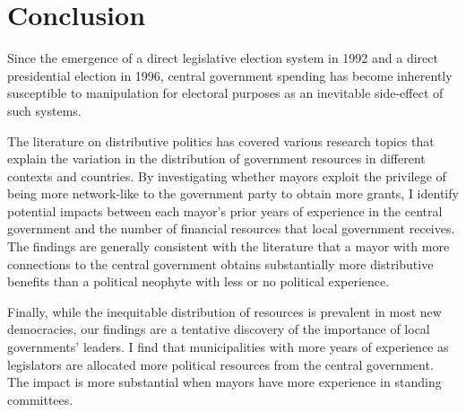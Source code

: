 \section*{\centering Conclusion}

Since the emergence of a direct legislative election system in 1992 and a direct presidential election in 1996, central government spending has become inherently susceptible to manipulation for electoral purposes as an inevitable side-effect of such systems. 

The literature on distributive politics has covered various research topics that explain the variation in the distribution of government resources in different contexts and countries. By investigating whether mayors exploit the privilege of being more network-like to the government party to obtain more grants, I identify potential impacts between each mayor's prior years of experience in the central government and the number of financial resources that local government receives. The findings are generally consistent with the literature \citep{Keefer2008,Keefer2009} that a mayor with more connections to the central government obtains substantially more distributive benefits than a political neophyte with less or no political experience.

Finally, while the inequitable distribution of resources is prevalent in most new democracies, our findings are a tentative discovery of the importance of local governments' leaders. I find that municipalities with more years of experience as legislators are allocated more political resources from the central government. The impact is more substantial when mayors have more experience in standing committees.